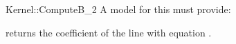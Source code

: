 \begin{ccRefFunctionObjectConcept}{Kernel::ComputeB_2}
A model for this must provide:


       {returns the coefficient  of the line with equation .}

\ccRefines
{}



\end{ccRefFunctionObjectConcept}
